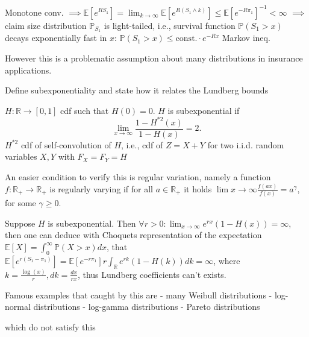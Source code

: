 \documentclass[11pt,a4paper,twoside]{article}
\begin{document}
Monotone conv. \(\implies \mathbb{E}[e^{R S_1}] = \lim_{k \rightarrow \infty} \mathbb{E}[e^{R(S_1 \wedge k)}] \le \mathbb{E}[e^{-R \pi_1}]^{-1} < \infty\)
\(\implies\) claim size distribution \(\mathbb{P}_{S_1}\) is light-tailed, i.e., survival function \(\mathbb{P}(S_1 > x)\) decays exponentially fast in \(x\):
\(\mathbb{P}(S_1 > x) \le \text{const.} \cdot e^{-Rx}\)
Markov ineq.

However this is a problematic assumption about many distributions in insurance applications.


Define subexponentiality and state how it relates the Lundberg bounds

\(H: \mathbb{R} \rightarrow [0, 1]\) cdf such that \(H(0) = 0\). \(H\) is subexponential if
\[\lim_{x \rightarrow \infty} \frac{1 - H^{*2}(x)}{1 - H(x)} = 2.\]
\(H^{*2}\) cdf of self-convolution of \(H\), i.e., cdf of \(Z = X + Y\) for two i.i.d. random variables \(X, Y\) with \(F_X = F_Y = H\)

An easier condition to verify this is regular variation, namely a function \( f : \mathbb{R}_{+} \to \mathbb{R}_{+} \)
is regularly varying if for all \( a \in \mathbb{R}_{+} \) it holds
\( \lim{x \to \infty} \frac{f(ax)}{f(x)} = a^\gamma \), for some \( \gamma \geq 0 \).

Suppose \( H \) is subexponential. Then
\( \forall r > 0 : \lim_{x \to \infty} e^{rx}(1 - H(x)) = \infty \), 
then one can deduce with Choquets representation of the expectation
\( \mathbb{E}[X] = \int_{0}^\infty \mathbb{P}(X > x)dx \),
that
\( \mathbb{E}[e^{r(S_1 - \pi_1)}] = \mathbb{E}[e^{-r\pi_1}] r\int_{\mathbb{R}} e^{rk}(1 - H(k)) dk = \infty\),
where \( k = \frac{\log(x)}{r}, dk = \frac{dx}{rx} \),
thus Lundberg coefficients can't exists.

Famous examples that caught by this are 
- many Weibull distributions
- log-normal distributions
- log-gamma distributions
- Pareto distributions

which do not satisfy this
\end{document}
